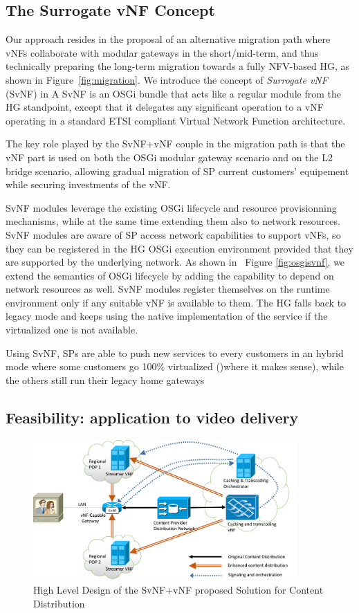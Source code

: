 \subsection{The Surrogate vNF Concept}

Our approach resides in the proposal of an alternative migration path where vNFs collaborate with modular gateways in the short/mid-term, and thus technically preparing the long-term migration towards a fully NFV-based HG, as shown in Figure~\ref{fig:migration}. We introduce the concept of \textit{Surrogate vNF} (SvNF) in  
A SvNF is an OSGi bundle that acts like a regular module from the HG standpoint, except that it delegates any significant operation to a vNF operating in a standard ETSI compliant Virtual Network Function architecture.

The key role played by the SvNF+vNF couple in the migration path is that the vNF part is used on both the OSGi modular gateway scenario and on the L2 bridge scenario, allowing gradual migration of SP current customers' equipement while securing investments of the vNF. 

SvNF modules leverage the existing OSGi lifecycle and resource provisionning mechanisms, while at the same time extending them also to network resources. SvNF modules are aware of SP access network capabilities to support vNFs, so they can be registered in the HG OSGi execution environment provided that they are supported by the underlying network.
As shown in ~Figure \ref{fig:osgisvnf}, we extend the semantics of OSGi lifecycle by adding the capability to depend on network resources as well. SvNF modules register themselves on the runtime environment only if any suitable vNF is available to them. The HG falls back to legacy mode and keeps using the native implementation of the service if the virtualized one is not available.

Using SvNF, SPs are able to push new services to every customers in an hybrid mode where some customers go 100\% virtualized ()where it makes sense), while the others still run their legacy home gateways

 
\subsection{Feasibility: application to video delivery}
\begin{figure}
	\center
	\includegraphics[width=0.90\textwidth,natwidth=8132,natheight=4335]{fig/highleveldesign.png}
	\caption{ High Level Design of the SvNF+vNF proposed Solution for Content Distribution
    \label{fig:hld}
    }
\end{figure}

